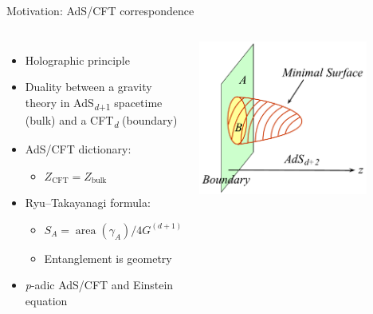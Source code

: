 \documentclass{fdubeamer}
\begin{document}
\begin{frame}{Motivation: AdS/CFT correspondence}

\begin{columns}[c]


    \begin{itemize}
      \item Holographic principle
      \item Duality between a gravity theory in AdS\textsubscript{\textit{d}+1} spacetime (bulk) and a CFT\textsubscript{\textit{d}} (boundary)
      \item AdS/CFT dictionary:

        \begin{itemize}
          \item $Z_{\mathrm{CFT}}=Z_{\mathrm{bulk}}$
        \end{itemize}

      \item Ryu--Takayanagi formula:

        \begin{itemize}
          \item $S_A = \operatorname{area}(\gamma_A) / 4G^{(d+1)}$
          \item Entanglement is geometry
        \end{itemize}

      \item \textit{p}-adic AdS/CFT and Einstein equation
    \end{itemize}


    \centering
    \includegraphics[width=0.8\textwidth]{images/rt-formula.pdf}

\end{columns}


\end{frame}
\end{document}
